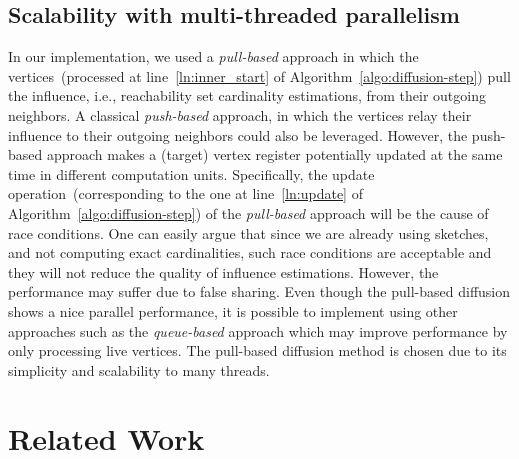 \subsection{Scalability with multi-threaded parallelism}


In our implementation, we used a {\em pull-based} approach in which the vertices~(processed at line~\ref{ln:inner_start} of Algorithm~\ref{algo:diffusion-step}) pull the influence, i.e., reachability set cardinality estimations, from their outgoing neighbors. A classical {\em push-based} approach, in which the vertices relay their influence to their outgoing neighbors could also be leveraged. However, the push-based approach makes a (target) vertex register potentially updated at the same time in different computation units. Specifically, the update operation~(corresponding to the one at line~\ref{ln:update} of Algorithm~\ref{algo:diffusion-step}) of the {\em pull-based} approach will be the cause of race conditions. One can easily argue that since we are already using sketches, and not computing exact cardinalities, such race conditions are acceptable and they will not reduce the quality of influence estimations. However, the performance may suffer due to false sharing. 
Even though the pull-based diffusion shows a nice parallel performance, it is possible to implement \acro using other approaches such as the {\em queue-based} approach which may improve performance by only processing live vertices. The pull-based diffusion method is chosen due to its simplicity and scalability to many threads.

\section{Related Work}\label{sec:relatedwork}

